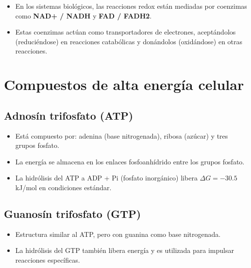 \begin{itemize}
    \item En los sistemas biológicos, las reacciones redox están mediadas por coenzimas como \textbf{NAD+ / NADH} y \textbf{FAD / FADH2}.
    \item Estas coenzimas actúan como transportadores de electrones, aceptándolos (reduciéndose) en reacciones catabólicas y donándolos (oxidándose) en otras reacciones.
\end{itemize}

\section{Compuestos de alta energía celular}


\subsection{Adnosín trifosfato (ATP)}
\begin{itemize}
    \item Está compuesto por: adenina (base nitrogenada), ribosa (azúcar) y tres grupos fosfato.
    \item La energía se almacena en los enlaces fosfoanhídrido entre los grupos fosfato.
    \item La hidrólisis del ATP a ADP + Pi (fosfato inorgánico) libera $\Delta G = -30.5$ kJ/mol en condiciones estándar.
\end{itemize}

\subsection{Guanosín trifosfato (GTP)}
\begin{itemize}
    \item Estructura similar al ATP, pero con guanina como base nitrogenada.
    \item La hidrólisis del GTP también libera energía y es utilizada para impulsar reacciones específicas.
\end{itemize}

